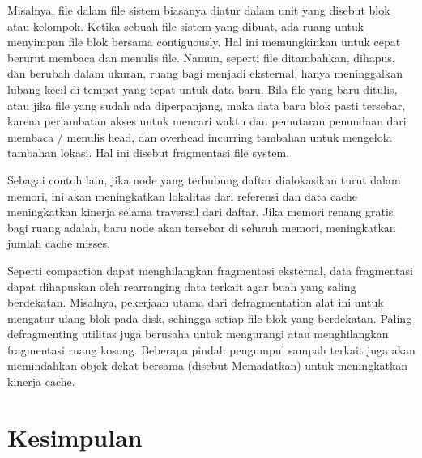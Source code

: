 Misalnya, file dalam file sistem biasanya diatur dalam unit yang disebut blok atau kelompok. Ketika sebuah file sistem yang dibuat, ada ruang untuk menyimpan file blok bersama contiguously. Hal ini memungkinkan untuk cepat berurut membaca dan menulis file. Namun, seperti file ditambahkan, dihapus, dan berubah dalam ukuran, ruang bagi menjadi eksternal, hanya meninggalkan lubang kecil di tempat yang tepat untuk data baru. Bila file yang baru ditulis, atau jika file yang sudah ada diperpanjang, maka data baru blok pasti tersebar, karena perlambatan akses untuk mencari waktu dan pemutaran penundaan dari membaca / menulis head, dan overhead incurring tambahan untuk mengelola tambahan lokasi. Hal ini disebut fragmentasi file system.

Sebagai contoh lain, jika node yang terhubung daftar dialokasikan turut dalam memori, ini akan meningkatkan lokalitas dari referensi dan data cache meningkatkan kinerja selama traversal dari daftar. Jika memori renang gratis bagi ruang adalah, baru node akan tersebar di seluruh memori, meningkatkan jumlah cache misses.

Seperti compaction dapat menghilangkan fragmentasi eksternal, data fragmentasi dapat dihapuskan oleh rearranging data terkait agar buah yang saling berdekatan. Misalnya, pekerjaan utama dari defragmentation alat ini untuk mengatur ulang blok pada disk, sehingga setiap file blok yang berdekatan. Paling defragmenting utilitas juga berusaha untuk mengurangi atau menghilangkan fragmentasi ruang kosong. Beberapa pindah pengumpul sampah terkait juga akan memindahkan objek dekat bersama (disebut Memadatkan) untuk meningkatkan kinerja cache.

\section{Kesimpulan}

